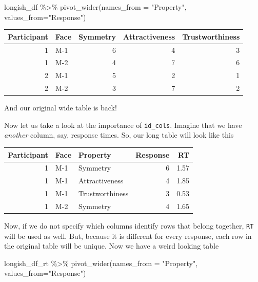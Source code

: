 \documentclass[
]{book}
\newenvironment{Shaded}{\begin{snugshade}}{\end{snugshade}}
\newcommand{\AttributeTok}[1]{\textcolor[rgb]{0.77,0.63,0.00}{#1}}
\newcommand{\FunctionTok}[1]{\textcolor[rgb]{0.00,0.00,0.00}{#1}}
\newcommand{\NormalTok}[1]{#1}
\newcommand{\SpecialCharTok}[1]{\textcolor[rgb]{0.00,0.00,0.00}{#1}}
\newcommand{\StringTok}[1]{\textcolor[rgb]{0.31,0.60,0.02}{#1}}
\begin{document}
\begin{Shaded}
\begin{Highlighting}[]
\NormalTok{longish\_df }\SpecialCharTok{\%\textgreater{}\%}
  \FunctionTok{pivot\_wider}\NormalTok{(}\AttributeTok{names\_from =} \StringTok{"Property"}\NormalTok{, }\AttributeTok{values\_from=}\StringTok{"Response"}\NormalTok{)}
\end{Highlighting}
\end{Shaded}

\begin{tabular}{r|l|r|r|r}
\hline
Participant & Face & Symmetry & Attractiveness & Trustworthiness\\
\hline
1 & M-1 & 6 & 4 & 3\\
\hline
1 & M-2 & 4 & 7 & 6\\
\hline
2 & M-1 & 5 & 2 & 1\\
\hline
2 & M-2 & 3 & 7 & 2\\
\hline
\end{tabular}

And our original wide table is back!

Now let us take a look at the importance of \texttt{id\_cols}. Imagine that we have \emph{another} column, say, response times. So, our long table will look like this

\begin{tabular}{r|l|l|r|r}
\hline
Participant & Face & Property & Response & RT\\
\hline
1 & M-1 & Symmetry & 6 & 1.57\\
\hline
1 & M-1 & Attractiveness & 4 & 1.85\\
\hline
1 & M-1 & Trustworthiness & 3 & 0.53\\
\hline
1 & M-2 & Symmetry & 4 & 1.65\\
\hline
\end{tabular}

Now, if we do not specify which columns identify rows that belong together, \texttt{RT} will be used as well. But, because it is different for every response, each row in the original table will be unique. Now we have a weird looking table

\begin{Shaded}
\begin{Highlighting}[]
\NormalTok{longish\_df\_rt }\SpecialCharTok{\%\textgreater{}\%}
  \FunctionTok{pivot\_wider}\NormalTok{(}\AttributeTok{names\_from =} \StringTok{"Property"}\NormalTok{, }\AttributeTok{values\_from=}\StringTok{"Response"}\NormalTok{)}
\end{Highlighting}
\end{Shaded}
\end{document}
